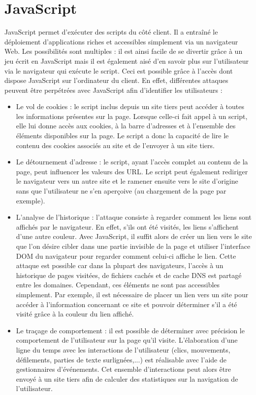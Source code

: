 \section{JavaScript}
\label{JavaScript}
JavaScript permet d'exécuter des scripts du côté client. Il a entraîné le déploiement d'applications riches et accessibles simplement via un navigateur Web. Les possibilités sont multiples : il est ainsi facile de se divertir grâce à un jeu écrit en JavaScript mais il est également aisé d'en savoir plus sur l'utilisateur via le navigateur qui exécute le script. Ceci est possible grâce à l'accès dont dispose JavaScript sur l'ordinateur du client. En effet, différentes attaques peuvent être perpétrées avec JavaScript afin d'identifier les utilisateurs \cite{Jang:2010:ESP:1866307.1866339} :

\begin{itemize}
	\item Le vol de cookies : le script inclus depuis un site tiers peut accéder à toutes les informations présentes sur la page. Lorsque celle-ci fait appel à un script, elle lui donne accès aux cookies, à la barre d'adresses et à l'ensemble des éléments disponibles sur la page. Le script a donc la capacité de lire le contenu des cookies associés au site et de l'envoyer à un site tiers.%
	\item Le détournement d'adresse : le script, ayant l'accès complet au contenu de la page, peut influencer les valeurs des URL. Le script peut également rediriger le navigateur vers un autre site et le ramener ensuite vers le site d'origine sans que l'utilisateur ne s'en aperçoive (au chargement de la page par exemple).
	\item L'analyse de l'historique : l'attaque consiste à regarder comment les liens sont affichés par le navigateur. En effet, s'ils ont été visités, les liens s'affichent d'une autre couleur. Avec JavaScript, il suffit alors de créer un lien vers le site que l'on désire cibler dans une partie invisible de la page et utiliser l'interface DOM du navigateur pour regarder comment celui-ci affiche le lien. Cette attaque est possible car dans la plupart des navigateurs, l'accès à un historique de pages visitées, de fichiers cachés et de cache DNS est partagé entre les domaines. Cependant, ces éléments ne sont pas accessibles simplement. Par exemple, il est nécessaire de placer un lien vers un site pour accéder à l'information concernant ce site et pouvoir déterminer s'il a été visité grâce à la couleur du lien affiché.
	\item Le traçage de comportement : il est possible de déterminer avec précision le comportement de l'utilisateur sur la page qu'il visite. L'élaboration d'une ligne du temps avec les interactions de l'utilisateur (clics, mouvements, défilements, parties de texte surlignées,...) est réalisable avec l'aide de gestionnaires d'événements. Cet ensemble d'interactions peut alors être envoyé à un site tiers afin de calculer des statistiques sur la navigation de l'utilisateur.
	\newline
\end{itemize}

